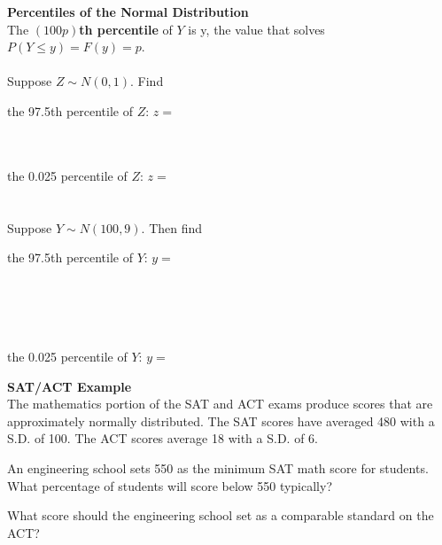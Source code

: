 \textbf{Percentiles of the Normal Distribution}\\
The \textbf{$(100p)$th percentile} of $Y$ is y, the value that solves $P(Y \leq y) = F(y)= p$. \\~\\
Suppose $Z \sim N(0,1)$. Find
\be
\item the 97.5th percentile of $Z$: $z=$\\~\\~\\
\item the 0.025 percentile of $Z$: $z=$\\~\\~\\
\ee
Suppose $Y \sim N(100, 9)$. Then find
\be
\item the 97.5th percentile of $Y$: $y=$\\~\\~\\~\\~\\
\item the 0.025 percentile of $Y$: $y=$
\ee

\pagebreak

\textbf{SAT/ACT Example}\\
The mathematics portion of the SAT and ACT exams produce scores that are approximately normally distributed.  The SAT scores have averaged 480 with a S.D. of 100.  The ACT scores average 18 with a S.D. of 6.
\be
\item An engineering school sets 550 as the minimum SAT math score for students.  What percentage of students will score below 550 typically?
\pagebreak
\item What score should the engineering school set as a comparable standard on the ACT?\\~\\~\\~\\~\\
\ee















